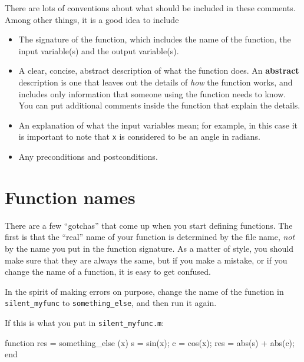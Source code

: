 \documentclass[
]{book}
\numberwithin{Answer}{chapter}
\numberwithin{Exercise}{chapter}
\begin{document}
There are lots of conventions about what should be included
in these comments.  Among other things, it is a good idea to
include

\begin{itemize}

\item The signature of the function, which includes the name
of the function, the input variable(s) and the output variable(s).

\item A clear, concise, abstract description of what the function does.
An {\bf abstract} description is one that leaves out the
details of {\em how} the function works, and includes only information
that someone using the function needs to know.  You can put additional
comments inside the function that explain the details.

\item An explanation of what the input variables mean; for example,
in this case it is important to note that {\tt x} is considered
to be an angle in radians.

\item Any preconditions and postconditions.

\end{itemize}



\section{Function names}

There are a few ``gotchas'' that come up when you start defining functions.
The first is that the ``real'' name of your function is determined by the file name, {\em not} by the name you put in the function signature.  As a matter of style, you
should make sure that they are always the same, but if you
make a mistake, or if you change the name of a function, it is
easy to get confused.


In the spirit of making errors on purpose, change the name of
the function in \verb"silent_myfunc" to \verb"something_else", and
then run it again.

If this is what you put in \verb"silent_myfunc.m":

\begin{code}
function res = something_else (x)
    s = sin(x);
    c = cos(x);
    res = abs(s) + abs(c);
end
\end{code}
\end{document}
